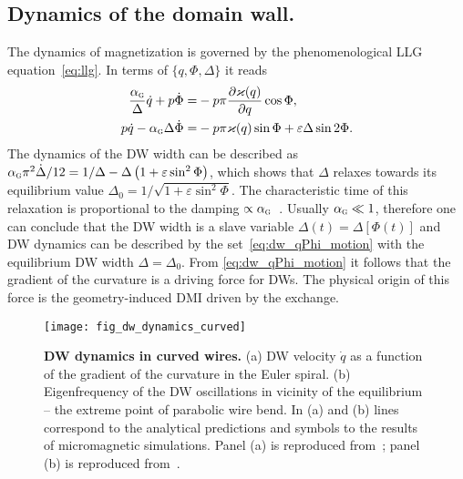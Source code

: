 \subsection{Dynamics of the domain wall.}

The dynamics of magnetization is governed by the phenomenological LLG equation~\eqref{eq:llg}. In terms of $\{q,\Phi,\Delta\}$ it reads~\cite{Yershov15b,Yershov18a}
\begin{equation}\label{eq:dw_qPhi_motion}
\begin{split}
\frac{\alpha_\textsc{g}}{\Delta}\dot{q}+p\dot{\Phi} = &-p\pi\frac{\partial\varkappa(q)}{\partial q}\cos\Phi,\\
p\dot{q}-\alpha_\textsc{g}\Delta\dot{\Phi} = &-p\pi\varkappa(q)\sin\Phi+\varepsilon\Delta\sin 2\Phi.
\end{split}
\end{equation}
The dynamics of the DW width can be described as $\alpha_\textsc{g}\pi^2\dot{\Delta}/12=1/\Delta-\Delta\left(1+\varepsilon\sin^2\Phi\right)$, which shows that $\Delta$ relaxes towards its equilibrium value $\Delta_0=1/\sqrt{1+\varepsilon\sin^2\Phi}$. The characteristic time of this relaxation is proportional to the damping $\propto \alpha_\textsc{g}$~\cite{Hillebrands06}. Usually $\alpha_\textsc{g}\ll1$, therefore one can conclude that the DW width is a slave variable $\Delta(t) = \Delta[\Phi(t)]$ and DW dynamics can be described by the set~\eqref{eq:dw_qPhi_motion}  with the equilibrium DW width $\Delta=\Delta_0$. From \eqref{eq:dw_qPhi_motion} it follows that the gradient of the curvature is a driving force for DWs. The physical origin of this force is the geometry-induced DMI driven by the exchange.

\begin{figure}[t]
	\texttt{[image: fig\_dw\_dynamics\_curved]}
	\caption{\label{fig:dw_wire_2}%
		\textbf{DW dynamics in curved wires.} (a) DW velocity $\dot{q}$ as a function of the gradient of the curvature in the Euler spiral. (b) Eigenfrequency of the DW oscillations in vicinity of the equilibrium -- the extreme point of parabolic wire bend.  In (a) and (b) lines correspond to the analytical predictions and symbols to the results of micromagnetic simulations. Panel (a) is reproduced from~\cite{Yershov18a}; panel (b) is reproduced from~\cite{Yershov15b}.}
\end{figure}

